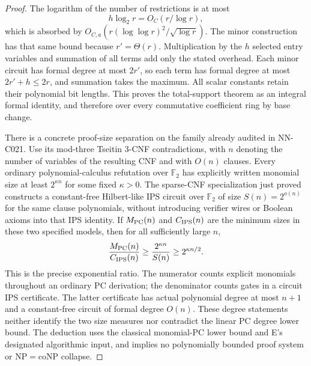 \begin{proof}
The logarithm of the number of restrictions is at most
\[
                   h\log_2r=O_C(r/\log r),
\]
which is absorbed by
$O_{C,a}(r(\log\log r)^2/\sqrt{\log r})$.
The minor construction has that same bound because
$r'=\Theta(r)$.  Multiplication by the $h$ selected entry
variables and summation of all terms add only the stated
overhead.  Each minor circuit has formal degree at most
$2r'$, so each term has formal degree at most
$2r'+h\le2r$, and summation takes the maximum.  All scalar
constants retain their polynomial bit lengths.  This
proves the total-support theorem as an integral formal
identity, and therefore over every commutative coefficient
ring by base change.

There is a concrete proof-size separation on the family already audited in NN-C021. Use its mod-three Tseitin 3-CNF contradictions, with $n$ denoting the number of variables of the resulting CNF and with $O(n)$ clauses. Every ordinary polynomial-calculus refutation over $\mathbb F_2$ has explicitly written monomial size at least $2^{\kappa n}$ for some fixed $\kappa>0$. The sparse-CNF specialization just proved constructs a constant-free Hilbert-like IPS circuit over $\mathbb F_2$ of size $S(n)=2^{o(n)}$ for the same clause polynomials, without introducing verifier wires or Boolean axioms into that IPS identity. If $M_{\rm PC}(n)$ and $C_{\rm IPS}(n)$ are the minimum sizes in these two specified models, then for all sufficiently large $n$,
\[
       \frac{M_{\rm PC}(n)}{C_{\rm IPS}(n)}
           \geq\frac{2^{\kappa n}}{S(n)}
           \geq 2^{\kappa n/2}.
\]
This is the precise exponential ratio. The numerator counts explicit monomials throughout an ordinary PC derivation; the denominator counts gates in a circuit IPS certificate. The latter certificate has actual polynomial degree at most $n+1$ and a constant-free circuit of formal degree $O(n)$. These degree statements neither identify the two size measures nor contradict the linear PC degree lower bound. The deduction uses the classical monomial-PC lower bound and E's designated algorithmic input, and implies no polynomially bounded proof system or $\mathrm{NP}=\mathrm{coNP}$ collapse.
\end{proof}
